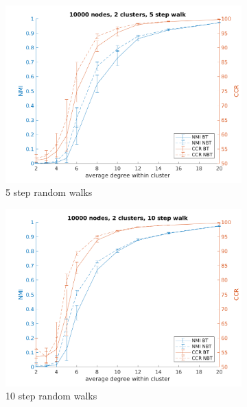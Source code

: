 \documentclass{article} %
\begin{document}
\begin{figure}[H] %
        \begin{subfigure}{0.33\textwidth}
        \includegraphics[width=\linewidth]{fig3/N10000K2len5} 
        \caption{5 step random walks}
        \label{fig:subim31}
    \end{subfigure}
    \begin{subfigure}{0.33\textwidth}
        \includegraphics[width=\linewidth]{fig3/N10000K2len10}
        \caption{10 step random walks}
        \label{fig:subim32}
    \end{subfigure}
    \begin{subfigure}{0.33\textwidth}

\end{subfigure}
\end{figure}
\end{document}
